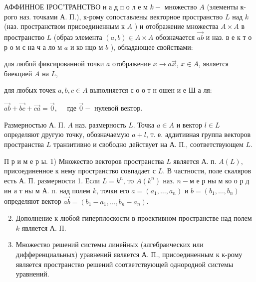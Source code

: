 \documentclass[10pt]{article}
\begin{document}
АФФИННОЕ ІРОС'ТРАНСТВО н а д п о л е м $k-$ множество $A$ (элементы к-рого наз. точками А. П.), к-рому сопоставлены векторное пространство $L$ над $k$ (наз. пространством присоединенным к $A$ ) и отображение множества $A \times A$ в пространство $L$ (образ элемента $(a, b) \in A \times A$ обозначается $\overrightarrow{a b}$ и наз. в е к т о р о м с на ч а ло м $a$ и ко нцо м $b$ ), обладающее свойствами:



для любой фиксированной точки $a$ отображение $x \rightarrow a \vec{x}$, $x \in A$, является биекцией $A$ на $L$,



для любых точек $a, b, c \in A$ выполняется с о о т н ошен и е Ш а ля:



$\overrightarrow{a b}+\overrightarrow{b c}+\overrightarrow{c a}=\overrightarrow{0}, \quad$ где $\overrightarrow{0}-$ нулевой вектор.



Размерностью А. П. $A$ наз. размерность $L$. Точка $a \in A$ и вектор $l \in L$ определяют другую точку, обозначаемую $a+l$, т. е. аддитивная группа векторов пространства $L$ транзитивно и свободно действует на А. П., соответствующем $L$.



П р и м е р ы. 1) Множество векторов пространства $L$ является А. п. $A(L)$, присоединенное к нему пространство совпадает с $L$. В частности, поле скаляров есть А. П. размерности 1. Если $L=k^{n}$, то $A\left(k^{n}\right)$ наз. $n-м$ е р ны м ко о р д ин а т ны м А. п. над полем $k$, точки его $a=\left(a_{1}, \ldots, a_{n}\right)$ и $b=\left(b_{1}, \ldots, b_{n}\right)$ определяют вектор $\overrightarrow{a b}=\left(b_{1}-a_{1}, \ldots, b_{n}-a_{n}\right)$.



\begin{enumerate}

  \setcounter{enumi}{1}

  \item Дополнение к любой гиперплоскости в проективном пространстве над полем $k$ является А. П.



  \item Множество решений системы линейных (алгебраических или дифференциальных) уравнений является А. П., присоединенным к к-рому является пространство решений соответствующей однородной системы уравнений.



\end{enumerate}
\end{document}
